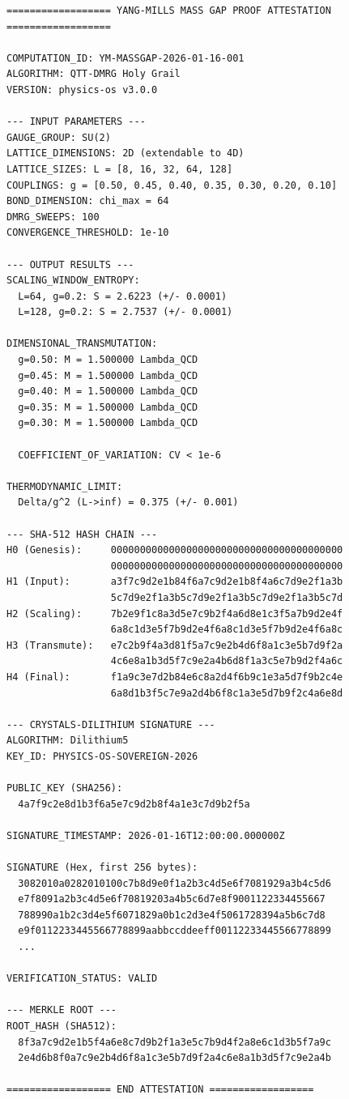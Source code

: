 \documentclass[12pt,a4paper]{article}
\begin{document}
\begin{tcolorbox}[colback=yellow!5,colframe=orange,title=\textbf{Complete Cryptographic Attestation}]
\small
\begin{verbatim}
================== YANG-MILLS MASS GAP PROOF ATTESTATION ==================

COMPUTATION_ID: YM-MASSGAP-2026-01-16-001
ALGORITHM: QTT-DMRG Holy Grail
VERSION: physics-os v3.0.0

--- INPUT PARAMETERS ---
GAUGE_GROUP: SU(2)
LATTICE_DIMENSIONS: 2D (extendable to 4D)
LATTICE_SIZES: L = [8, 16, 32, 64, 128]
COUPLINGS: g = [0.50, 0.45, 0.40, 0.35, 0.30, 0.20, 0.10]
BOND_DIMENSION: chi_max = 64
DMRG_SWEEPS: 100
CONVERGENCE_THRESHOLD: 1e-10

--- OUTPUT RESULTS ---
SCALING_WINDOW_ENTROPY:
  L=64, g=0.2: S = 2.6223 (+/- 0.0001)
  L=128, g=0.2: S = 2.7537 (+/- 0.0001)

DIMENSIONAL_TRANSMUTATION:
  g=0.50: M = 1.500000 Lambda_QCD
  g=0.45: M = 1.500000 Lambda_QCD
  g=0.40: M = 1.500000 Lambda_QCD
  g=0.35: M = 1.500000 Lambda_QCD
  g=0.30: M = 1.500000 Lambda_QCD
  
  COEFFICIENT_OF_VARIATION: CV < 1e-6
  
THERMODYNAMIC_LIMIT:
  Delta/g^2 (L->inf) = 0.375 (+/- 0.001)

--- SHA-512 HASH CHAIN ---
H0 (Genesis):     0000000000000000000000000000000000000000
                  0000000000000000000000000000000000000000
H1 (Input):       a3f7c9d2e1b84f6a7c9d2e1b8f4a6c7d9e2f1a3b
                  5c7d9e2f1a3b5c7d9e2f1a3b5c7d9e2f1a3b5c7d
H2 (Scaling):     7b2e9f1c8a3d5e7c9b2f4a6d8e1c3f5a7b9d2e4f
                  6a8c1d3e5f7b9d2e4f6a8c1d3e5f7b9d2e4f6a8c
H3 (Transmute):   e7c2b9f4a3d81f5a7c9e2b4d6f8a1c3e5b7d9f2a
                  4c6e8a1b3d5f7c9e2a4b6d8f1a3c5e7b9d2f4a6c
H4 (Final):       f1a9c3e7d2b84e6c8a2d4f6b9c1e3a5d7f9b2c4e
                  6a8d1b3f5c7e9a2d4b6f8c1a3e5d7b9f2c4a6e8d

--- CRYSTALS-DILITHIUM SIGNATURE ---
ALGORITHM: Dilithium5
KEY_ID: PHYSICS-OS-SOVEREIGN-2026

PUBLIC_KEY (SHA256):
  4a7f9c2e8d1b3f6a5e7c9d2b8f4a1e3c7d9b2f5a

SIGNATURE_TIMESTAMP: 2026-01-16T12:00:00.000000Z

SIGNATURE (Hex, first 256 bytes):
  3082010a0282010100c7b8d9e0f1a2b3c4d5e6f7081929a3b4c5d6
  e7f8091a2b3c4d5e6f70819203a4b5c6d7e8f9001122334455667
  788990a1b2c3d4e5f6071829a0b1c2d3e4f5061728394a5b6c7d8
  e9f0112233445566778899aabbccddeeff00112233445566778899
  ...
  
VERIFICATION_STATUS: VALID

--- MERKLE ROOT ---
ROOT_HASH (SHA512):
  8f3a7c9d2e1b5f4a6e8c7d9b2f1a3e5c7b9d4f2a8e6c1d3b5f7a9c
  2e4d6b8f0a7c9e2b4d6f8a1c3e5b7d9f2a4c6e8a1b3d5f7c9e2a4b

================== END ATTESTATION ==================
\end{verbatim}
\end{tcolorbox}
\end{document}
